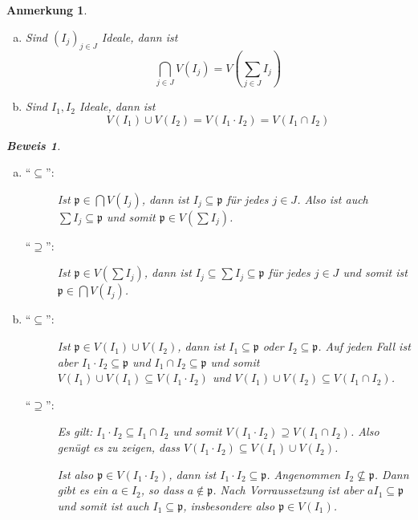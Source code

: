 \documentclass[a4paper,oneside]{scrbook}
\theoremstyle{break}
\theoremstyle{nonumberbreak}
\theoremstyle{nonumberplain}
\newtheorem{Bew}{Beweis}
\theoremstyle{break}
\newtheorem{anmerkung}{Anmerkung}
\begin{document}
\begin{anmerkung}
	\begin{enumerate}[(a)]
		\item Sind $\left(I_j\right)_{j \in J}$ Ideale, dann ist
			\[
				\bigcap_{j\in J} V\left(I_j\right) = V\left( \sum_{j\in J} I_j \right)
			\]
		\item Sind $I_1, I_2$ Ideale, dann ist
			\[
				V\left(I_1\right) \cup V\left(I_2\right) = V\left( I_1 \cdot I_2 \right) = V\left( I_1 \cap I_2 \right)
			\]
	\end{enumerate}
	\begin{Bew}
		\begin{enumerate}[(a)]
			\item 
				\begin{description}
					\item[``$\subseteq$'':]
						Ist $\mathfrak{p} \in \bigcap V\left(I_j\right)$, dann ist $I_j \subseteq \mathfrak{p}$ für jedes $j \in J$.
						Also ist auch $\sum I_j \subseteq \mathfrak{p}$ und somit $\mathfrak{p} \in V\left( \sum I_j \right)$.
					\item[``$\supseteq$'':]
						Ist $\mathfrak{p} \in V\left( \sum I_j \right)$, dann ist $I_j \subseteq \sum I_j \subseteq \mathfrak{p}$ für jedes $j \in J$ und
						somit ist $\mathfrak{p} \in \bigcap V\left(I_j\right)$.
				\end{description}
			\item
				\begin{description}
					\item[``$\subseteq$'':]
						Ist $\mathfrak{p} \in V\left(I_1\right) \cup V(I_2)$, dann ist $I_1 \subseteq \mathfrak{p}$ oder $I_2 \subseteq \mathfrak{p}$.
						Auf jeden Fall ist aber $I_1 \cdot I_2 \subseteq \mathfrak{p}$ und $I_1 \cap I_2 \subseteq \mathfrak{p}$ und somit
						$V\left(I_1\right) \cup V(I_1) \subseteq V\left(I_1 \cdot I_2\right)$ und 
						$V(I_1) \cup V\left(I_2\right) \subseteq V\left( I_1 \cap I_2 \right)$.
					\item[``$\supseteq$'':]
						Es gilt: $I_1 \cdot I_2 \subseteq I_1 \cap I_2$ und somit 
						$V\left(I_1 \cdot I_2\right) \supseteq V\left(I_1 \cap I_2\right)$. Also
						genügt es zu zeigen, dass $V\left(I_1 \cdot I_2 \right) \subseteq V\left(I_1\right) \cup V\left(I_2\right)$.

						Ist also $\mathfrak{p} \in V\left(I_1 \cdot I_2\right)$, dann ist $I_1 \cdot I_2 \subseteq \mathfrak{p}$.
						Angenommen $I_2 \nsubseteq \mathfrak{p}$. Dann gibt es ein $a \in I_2$, so dass $a \notin \mathfrak{p}$.
						Nach Vorraussetzung ist aber $aI_1 \subseteq \mathfrak{p}$ und somit ist auch $I_1 \subseteq \mathfrak{p}$,
						insbesondere also $\mathfrak{p} \in V\left(I_1\right)$.
				\end{description}
		\end{enumerate}
	\end{Bew}
\end{anmerkung}
\end{document}
